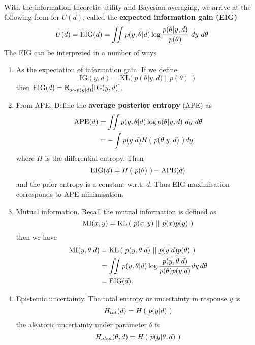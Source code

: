 With the information-theoretic utility and Bayesian averaging, we arrive at the following form for $U(d)$, called the \textbf{expected information gain (EIG)}
\begin{equation}
	U(d) = \text{EIG}(d) = \iint p(y, \theta | d) \log\frac{p(\theta | y, d)}{p(\theta)} \ dy\ d\theta
\end{equation}
The EIG can be interpreted in a number of ways
\begin{enumerate}
\item As the expectation of information gain. If we define
\begin{equation}
	\text{IG}(y, d) = \text{KL}(\ p(\theta | y, d)\ ||\ p(\theta)\ ) 
\end{equation}
then $\text{EIG}(d) = \mathbb{E}_{y\sim p(y|d)}[\text{IG}(y, d)] $.
\item From APE. Define the \textbf{average posterior entropy} (APE) as 
\begin{align}
	\label{eq:apedef}
	\ape(d) &= \iint p(y, \theta | d) \log p(\theta | y, d) \ dy \ d\theta \\
	&= -\int p(y|d) \entropy{p(\theta | y, d)} dy
\end{align}
where $H$ is the differential entropy.
Then
\begin{equation}
	\label{eq:apeeig}
	\text{EIG}(d) = H\left(\ p(\theta)\ \right) - \text{APE}(d)
\end{equation}
and the prior entropy is a constant w.r.t. $d$. Thus EIG maximisation corresponds to APE
minimisation.
\item Mutual information. Recall the mutual information is defined as
\begin{equation}
	\text{MI}(x, y) = \text{KL}\left(\ p(x, y)\ ||\ p(x)p(y)\ \right)
\end{equation}
then we have
\begin{align}
	\text{MI}(y, \theta | d) &= \text{KL}\left(\ p(y, \theta | d)\ ||\ p(y|d)p(\theta)\ \right) \\
	&= \iint p(y, \theta | d) \log \frac{p(y, \theta | d)}{p(\theta)p(y|d)} dy \, d\theta \\
	&= \text{EIG}(d).
\end{align}
\item Epistemic uncertainty.
The total entropy or uncertainty in response $y$ is
\begin{equation}
	H_{tot}(d) = H\left(\ p(y|d)\ \right)
\end{equation}
the aleatoric uncertainty under parameter $\theta$ is
\begin{equation}
	H_{alea}(\theta, d) = H\left(\ p(y|\theta, d)\ \right)
\end{equation}

\end{enumerate}
